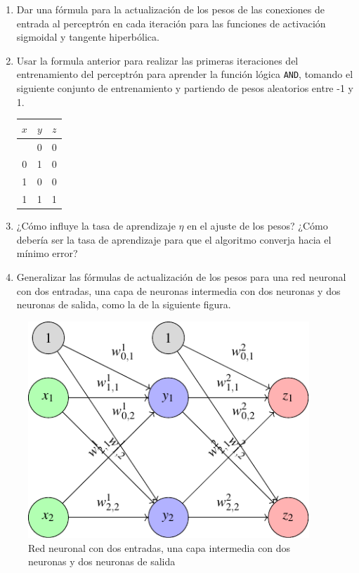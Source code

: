 \documentclass[
  a4paper,
]{scrreport}
\begin{document}
\begin{enumerate}
\def\labelenumi{\arabic{enumi}.}
\item
  Dar una fórmula para la actualización de los pesos de las conexiones
  de entrada al perceptrón en cada iteración para las funciones de
  activación sigmoidal y tangente hiperbólica.
\item
  Usar la formula anterior para realizar las primeras iteraciones del
  entrenamiento del perceptrón para aprender la función lógica
  \texttt{AND}, tomando el siguiente conjunto de entrenamiento y
  partiendo de pesos aleatorios entre -1 y 1.

  \begin{longtable}[]{@{}ccc@{}}
  \toprule\noalign{}
  \(x\) & \(y\) & \(z\) \\
  \midrule\noalign{}
  \endhead
  \bottomrule\noalign{}
  \endlastfoot
  0 & 0 & 0 \\
  0 & 1 & 0 \\
  1 & 0 & 0 \\
  1 & 1 & 1 \\
  \end{longtable}
\item
  ¿Cómo influye la tasa de aprendizaje \(\eta\) en el ajuste de los
  pesos? ¿Cómo debería ser la tasa de aprendizaje para que el algoritmo
  converja hacia el mínimo error?
\item
  Generalizar las fórmulas de actualización de los pesos para una red
  neuronal con dos entradas, una capa de neuronas intermedia con dos
  neuronas y dos neuronas de salida, como la de la siguiente figura.
\end{enumerate}

\begin{figure}[H]

{\centering \includegraphics[width=4.16667in,height=\textheight]{img/perceptron/red-neuronas.pdf}

}

\caption{Red neuronal con dos entradas, una capa intermedia con dos
neuronas y dos neuronas de salida}

\end{figure}%
\end{document}
